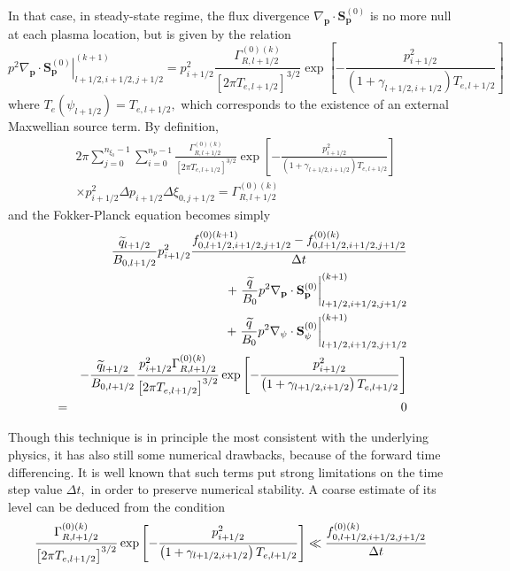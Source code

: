 In that case, in steady-state regime, the flux divergence $\nabla _{\mathbf{p%
}}\cdot \mathbf{S}_{\mathbf{p}}^{\left( 0\right) }$ is no more null at each
plasma location, but is given by the relation
\begin{equation}
\left. p^{2}\nabla _{\mathbf{p}}\cdot \mathbf{S}_{\mathbf{p}}^{\left(
0\right) }\right| _{l+1/2,i+1/2,j+1/2}^{(k+1)}=p_{i+1/2}^{2}\frac{\Gamma
_{R,l+1/2}^{\left( 0\right) (k)}}{\left[ 2\pi T_{e,l+1/2}\right] ^{3/2}}\exp
\left[ -\frac{p_{i+1/2}^{2}}{\left( 1+\gamma _{l+1/2,i+1/2}\right)
T_{e,l+1/2}}\right]
\end{equation}
where $T_{e}\left( \psi _{l+1/2}\right) =T_{e,l+1/2},$ which corresponds to
the existence of an external Maxwellian source term. By definition,
\begin{align}
&2\pi \sum_{j=0}^{n_{\xi _{0}}-1}\sum_{i=0}^{n_{p}-1}\frac{\Gamma
_{R,l+1/2}^{\left( 0\right) (k)}}{\left[ 2\pi T_{e,l+1/2}\right]
^{3/2}}\exp \left[ -\frac{p_{i+1/2}^{2}}{\left( 1+\gamma
_{l+1/2,i+1/2}\right) T_{e,l+1/2}}\right]\nonumber\\&\times
p_{i+1/2}^{2}\Delta p_{i+1/2}\Delta \xi _{0,j+1/2}=\Gamma
_{R,l+1/2}^{\left( 0\right) (k)}
\end{align}
and the Fokker-Planck equation becomes simply
\begin{eqnarray}
&&\frac{\widetilde{q}_{l+1/2}}{B_{0,l+1/2}}p_{i+1/2}^{2}\frac{%
f_{0,l+1/2,i+1/2,j+1/2}^{\left( 0\right)
(k+1)}-f_{0,l+1/2,i+1/2,j+1/2}^{\left( 0\right) (k)}}{\Delta t}  \nonumber \\
&&+\left. \frac{\widetilde{q}}{B_{0}}p^{2}\nabla _{\mathbf{p}}\cdot \mathbf{S%
}_{\mathbf{p}}^{\left( 0\right) }\right| _{l+1/2,i+1/2,j+1/2}^{(k+1)}
\nonumber \\
&&+\left. \frac{\widetilde{q}}{B_{0}}p^{2}\nabla _{\psi }\cdot \mathbf{S}%
_{\psi }^{\left( 0\right) }\right| _{l+1/2,i+1/2,j+1/2}^{(k+1)}  \nonumber \\
&&-\frac{\widetilde{q}_{l+1/2}}{B_{0,l+1/2}}\frac{p_{i+1/2}^{2}\Gamma
_{R,l+1/2}^{\left( 0\right) (k)}}{\left[ 2\pi T_{e,l+1/2}\right] ^{3/2}}\exp
\left[ -\frac{p_{i+1/2}^{2}}{\left( 1+\gamma _{l+1/2,i+1/2}\right)
T_{e,l+1/2}}\right]   \nonumber \\
&=&0
\end{eqnarray}

Though this technique is in principle the most consistent with the
underlying physics, it has also still some numerical drawbacks, because of
the forward time differencing. It is well known that such terms put strong
limitations on the time step value $\Delta t,$ in order to preserve
numerical stability. A coarse estimate of its level can be deduced from the
condition
\begin{equation}
\frac{\Gamma _{R,l+1/2}^{\left( 0\right) (k)}}{\left[ 2\pi
T_{e,l+1/2}\right] ^{3/2}}\exp \left[ -\frac{p_{i+1/2}^{2}}{\left( 1+\gamma
_{l+1/2,i+1/2}\right) T_{e,l+1/2}}\right] \ll \frac{%
f_{0,l+1/2,i+1/2,j+1/2}^{\left( 0\right) (k)}}{\Delta t}
\end{equation}

